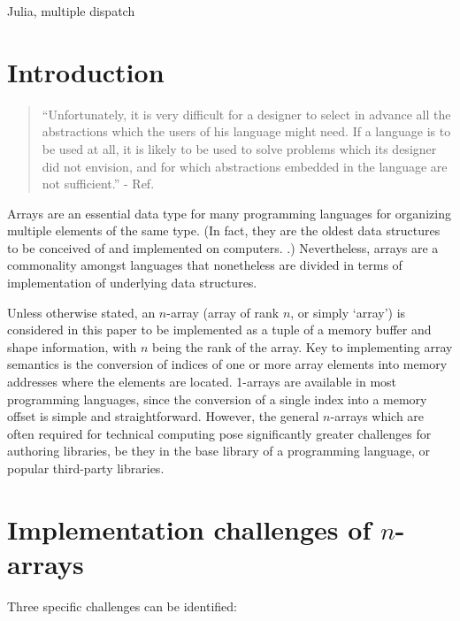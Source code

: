\documentclass[preprint]{sigplanconf}
\begin{document}

\keywords
Julia, multiple dispatch

\section{Introduction}

\begin{quotation}
``Unfortunately, it is very difficult for a designer to select in advance all
the abstractions which the users of his language might need. If a language is
to be used at all, it is likely to be used to solve problems which its
designer did not envision, and for which abstractions embedded in the language
are not sufficient.'' - Ref. \cite{Liskov:1974pb}
\end{quotation}

Arrays are an essential data type for many programming languages for
organizing multiple elements of the same type. (In fact, they are the oldest
data structures to be conceived of and implemented on computers.
\cite{Zuse:1948ua, Rojas:2000pk, Backus:1956pr}.) Nevertheless, arrays are a
commonality amongst languages that nonetheless are divided in terms of
implementation of underlying data structures.


Unless otherwise stated, an $n$-array (array of rank $n$, or simply `array')
is considered in this paper to be implemented as a tuple of a memory buffer
and shape information, with $n$ being the rank of the array. Key to
implementing array semantics is the conversion of indices of one or more array
elements into memory addresses where the elements are located. 1-arrays are
available in most programming languages, since the conversion of a single
index into a memory offset is simple and straightforward. However, the general
$n$-arrays which are often required for technical computing pose significantly
greater challenges for authoring libraries, be they in the base library of a
programming language, or popular third-party libraries.

\section{Implementation challenges of $n$-arrays}

Three specific challenges can be identified:
\end{document}
